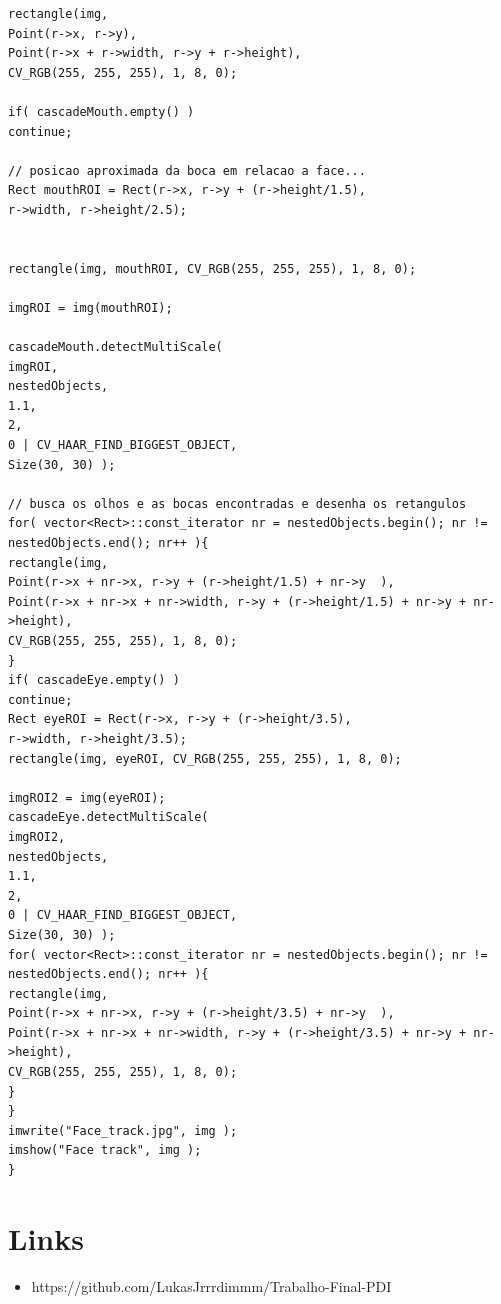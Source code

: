 \documentclass{article}
\begin{document}
\begin{lstlisting}
rectangle(img,  
Point(r->x, r->y),  
Point(r->x + r->width, r->y + r->height),  
CV_RGB(255, 255, 255), 1, 8, 0);

if( cascadeMouth.empty() )
continue;

// posicao aproximada da boca em relacao a face...
Rect mouthROI = Rect(r->x, r->y + (r->height/1.5), 
r->width, r->height/2.5);


rectangle(img, mouthROI, CV_RGB(255, 255, 255), 1, 8, 0);

imgROI = img(mouthROI);

cascadeMouth.detectMultiScale(
imgROI,
nestedObjects,
1.1,
2,
0 | CV_HAAR_FIND_BIGGEST_OBJECT,
Size(30, 30) );

// busca os olhos e as bocas encontradas e desenha os retangulos
for( vector<Rect>::const_iterator nr = nestedObjects.begin(); nr != nestedObjects.end(); nr++ ){
rectangle(img,  
Point(r->x + nr->x, r->y + (r->height/1.5) + nr->y  ),  
Point(r->x + nr->x + nr->width, r->y + (r->height/1.5) + nr->y + nr->height),  
CV_RGB(255, 255, 255), 1, 8, 0);
}
if( cascadeEye.empty() )
continue;
Rect eyeROI = Rect(r->x, r->y + (r->height/3.5), 
r->width, r->height/3.5);
rectangle(img, eyeROI, CV_RGB(255, 255, 255), 1, 8, 0);

imgROI2 = img(eyeROI);
cascadeEye.detectMultiScale(
imgROI2,
nestedObjects,
1.1,
2,
0 | CV_HAAR_FIND_BIGGEST_OBJECT,
Size(30, 30) );
for( vector<Rect>::const_iterator nr = nestedObjects.begin(); nr != nestedObjects.end(); nr++ ){
rectangle(img,  
Point(r->x + nr->x, r->y + (r->height/3.5) + nr->y  ),  
Point(r->x + nr->x + nr->width, r->y + (r->height/3.5) + nr->y + nr->height),  
CV_RGB(255, 255, 255), 1, 8, 0);
}
}
imwrite("Face_track.jpg", img );
imshow("Face track", img );
}
	\end{lstlisting}
	\newpage
	\section{Links}
	\vspace{5mm}
	\begin{itemize}
		\item https://github.com/LukasJrrrdimmm/Trabalho-Final-PDI
	\end{itemize}
\end{document}
